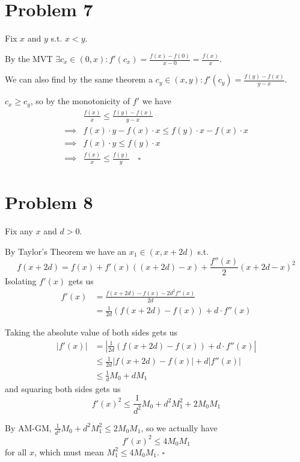 \documentclass[12pt]{article}
\begin{document}
\pagebreak

\section{Problem 7}

Fix $x$ and $y$ s.t. $x < y$.

By the MVT $\exists c_x \in (0, x): f'(c_x) = \frac{f(x)-f(0)}{x-0}=\frac{f(x)}{x}$.

We can also find by the same theorem a $c_y \in (x, y): f'(c_y) = \frac{f(y)-f(x)}{y-x}$.

$c_x \ge c_y$, so by the monotonicity of $f'$ we have
\begin{align*}
             & \frac{f(x)}{x} \le \frac{f(y)-f(x)}{y-x}                    \\
  \implies{} & f(x) \cdot y - f(x) \cdot x \le f(y) \cdot x - f(x) \cdot x \\
  \implies{} & f(x) \cdot y \le f(y) \cdot x                               \\
  \implies{} & \frac{f(x)}{x} \le \frac{f(y)}{y}\quad\square
\end{align*}

\pagebreak

\section{Problem 8}

Fix any $x$ and $d > 0$.

By Taylor's Theorem we have an $x_1 \in (x, x+2d)$ s.t.
\[f(x+2d)=f(x)+f'(x)((x+2d)-x)+\frac{f''(x)}{2}(x+2d-x)^2\]
Isolating $f'(x)$ gets us
\begin{align*}
  f'(x) & = \frac{f(x+2d)-f(x)-2d^2f''(x)}{2d}        \\
        & = \frac{1}{2d}(f(x+2d)-f(x))+d \cdot f''(x)
\end{align*}

Taking the absolute value of both sides gets us
\begin{align*}
  |f'(x)| & = \left|\frac{1}{2d}(f(x+2d)-f(x))+d \cdot f''(x)\right| \\
          & \le \frac{1}{2d}\left|f(x+2d)-f(x)\right| + d|f''(x)|    \\
          & \le \frac{1}{d}M_0 + dM_1
\end{align*}
and squaring both sides gets us
\[f'(x)^2 \le \frac{1}{d^2}M_0+d^2M_1^2+2M_0M_1\]

By AM-GM, $\frac{1}{d^2}M_0+d^2M_1^2 \le 2M_0M_1$, so we actually have
\[f'(x)^2 \le 4M_0M_1\]
for all $x$, which must mean $M_1^2 \le 4M_0M_1$. $\square$
\end{document}
